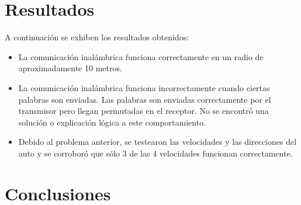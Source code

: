 \documentclass[a4paper,10pt]{article}
\begin{document}
	\section{Resultados}
		A continuación se exhiben los resultados obtenidos:
		\begin{itemize}
			\item La comunicación inalámbrica funciona correctamente en un radio de aproximadamente 10 metros.
			\item La comunicación inalámbrica funciona incorrectamente cuando ciertas palabras son enviadas. Las palabras son enviadas correctamente por el 
			transmisor pero llegan permutadas en el receptor. No se encontró una solución o explicación lógica a este comportamiento.
			\item Debido al problema anterior, se testearon las velocidades y las direcciones del auto y se corroboró que sólo 3 de las 4 velocidades funcionan
			correctamente.
		\end{itemize}
   
	\section{Conclusiones}
		
			
\end{document}
